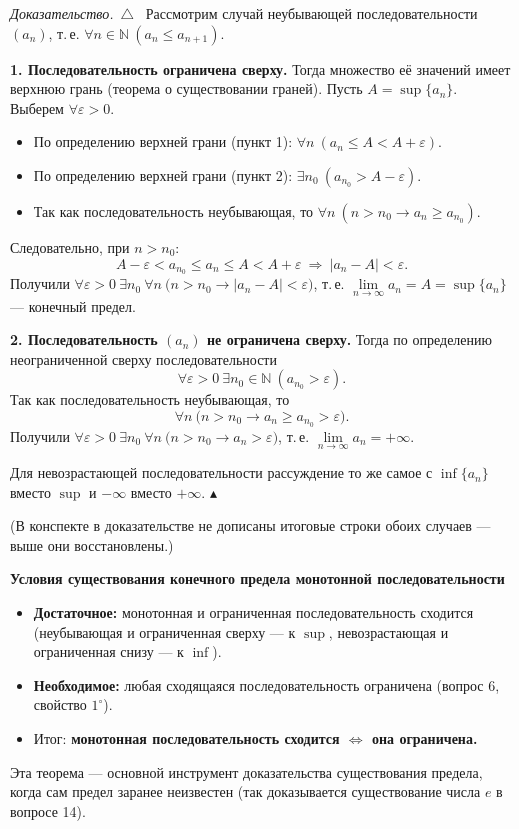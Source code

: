 \documentclass[a4paper,11pt]{article}
\newcommand{\N}{\mathbb{N}}
\newcommand{\eps}{\varepsilon}
\newenvironment{dok}
  {\par\smallskip\noindent\textit{Доказательство.}\ $\triangle$\ \ignorespaces}
  {\unskip\nobreak\hfill$\blacktriangle$\par\smallskip}
\newcommand{\podr}[1]{\par\needspace{8\baselineskip}\medskip
  {\large\bfseries\textcolor{oprc!80!black}{#1}}\par\nopagebreak\smallskip}
\begin{document}
\begin{dok}
Рассмотрим случай неубывающей последовательности $(a_n)$, т.\,е. $\forall n \in \N\ (a_n \le a_{n+1})$.

\textbf{1. Последовательность ограничена сверху.} Тогда множество её значений имеет верхнюю грань (теорема о существовании граней).
Пусть $A = \sup\{a_n\}$. Выберем $\forall \eps > 0$.
\begin{itemize}
  \item По определению верхней грани (пункт 1): $\forall n\ (a_n \le A < A + \eps)$.
  \item По определению верхней грани (пункт 2): $\exists n_0\ (a_{n_0} > A - \eps)$.
  \item Так как последовательность неубывающая, то $\forall n\ (n > n_0 \to a_n \ge a_{n_0})$.
\end{itemize}
Следовательно, при $n > n_0$:
\[
  A - \eps < a_{n_0} \le a_n \le A < A + \eps \ \Longrightarrow\ |a_n - A| < \eps.
\]
Получили $\forall \eps > 0\ \exists n_0\ \forall n\ \bigl(n > n_0 \to |a_n - A| < \eps\bigr)$, т.\,е. $\lim\limits_{n \to \infty} a_n = A = \sup\{a_n\}$ --- конечный предел.

\textbf{2. Последовательность $(a_n)$ не ограничена сверху.} Тогда по определению неограниченной сверху последовательности
\[
  \forall \eps > 0\ \exists n_0 \in \N\ (a_{n_0} > \eps).
\]
Так как последовательность неубывающая, то
\[
  \forall n\ \bigl(n > n_0 \to a_n \ge a_{n_0} > \eps\bigr).
\]
Получили $\forall \eps > 0\ \exists n_0\ \forall n\ \bigl(n > n_0 \to a_n > \eps\bigr)$, т.\,е. $\lim\limits_{n \to \infty} a_n = +\infty$.

Для невозрастающей последовательности рассуждение то же самое с $\inf\{a_n\}$ вместо $\sup$ и $-\infty$ вместо $+\infty$.
\end{dok}

{\small\textcolor{zamc}{(В конспекте в доказательстве не дописаны итоговые строки обоих случаев --- выше они восстановлены.)}}

\podr{Условия существования конечного предела монотонной последовательности}

\begin{itemize}[leftmargin=*]
  \item \textbf{Достаточное:} монотонная и ограниченная последовательность сходится (неубывающая и ограниченная сверху ---
        к $\sup$, невозрастающая и ограниченная снизу --- к $\inf$).
  \item \textbf{Необходимое:} любая сходящаяся последовательность ограничена (вопрос 6, свойство $1^\circ$).
  \item Итог: \textbf{монотонная последовательность сходится $\iff$ она ограничена.}
\end{itemize}
Эта теорема --- основной инструмент доказательства существования предела, когда сам предел заранее неизвестен
(так доказывается существование числа $e$ в вопросе 14).
\end{document}
